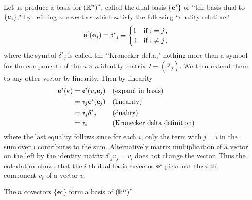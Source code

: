 Let us produce a basis for $\left(\mathbb{R}^n\right)^*$, called the dual basis $\{\mathbf{ e}^i\}$ or ``the basis dual to $\{\mathbf{ e}_i\}$," by defining $n$ covectors which satisfy the following ``duality relations"
$$
 \mathbf{ e}^i(\mathbf{ e}_j) =\delta^i{}_j\equiv
 \begin{cases} 1& \text{if $i=j$\,,}\\
	 0& \text{if  $i\not =j$\,,}
\end{cases} 
$$
where the symbol $\delta^i{}_j$ is called the ``Kronecker delta,"
nothing more than a symbol for the components of the $n\times n$ identity matrix $I=(\delta^i{}_j)$. We then extend them to any other vector by linearity.
Then by linearity
\begin{align*}
   \mathbf{ e}^i(\mathbf{ v}) &= \mathbf{ e}^i(v_j \mathbf{ e}_j)
&& \text{(expand in basis)}
\\
               &= v_j\mathbf{ e}^i(\mathbf{ e}_j)
&& \text{(linearity)}
\\
               &= v_j\delta^i{}_j
&& \text{(duality)}
\\
               &=v_i
&& \text{(Kronecker delta definition)}
\end{align*}
where the last equality follows since for each $i$, only the term with $j=i$  in the sum over $j$ contributes to the sum.
Alternatively matrix multiplication of a vector on the left by the identity matrix $\delta^i{}_j v_j = v_i$ does not change the vector.
Thus the calculation shows that the $i$-th dual basis covector $\mathbf{ e}^i$ picks out the $i$-th component $v_i$ of a vector $v$. 


\begin{theorem}
 The $n$ covectors $\{\mathbf{ e}^i\}$ form a basis of $\left(\mathbb{R}^n\right)^*$.
\end{theorem}


